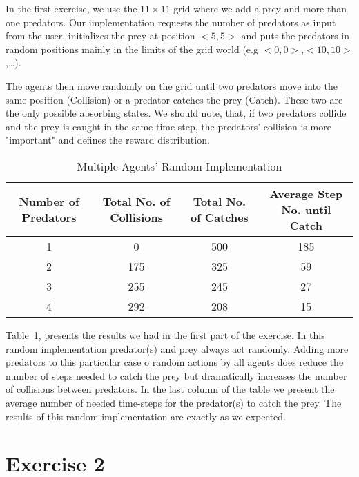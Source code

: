 \documentclass[a4paper,11pt]{article}
\begin{document}
In the first exercise, we use the $11 \times 11$ grid where we add a prey and more than one predators. Our implementation requests the number of predators as input from the user, initializes the prey at position $<5,5>$ and puts the predators in random positions mainly in the limits of the grid world (e.g $<0,0>$,$<10,10>$,\ldots). 

The agents then move randomly on the grid until two predators move into the same position (Collision) or a predator catches the prey (Catch). These two are the only possible absorbing states. We should note, that, if two predators collide and the prey is caught in the same time-step, the predators' collision is more "important" and defines the reward distribution.


\begin{table}[h]
\begin{center}
\caption{Multiple Agents' Random Implementation}
\begin{tabular}{c c c c} 
\hline\hline               
\textbf{\small{Number of Predators}} & \textbf{\small{Total No. of Collisions}} & \textbf{\small{Total No. of Catches}} & \textbf{\small{Average Step No. until Catch}} \\  
\hline
1 & 0 & 500 & 185\\ 
2 & 175 & 325  & 59\\
3 & 255 & 245   & 27\\
4 & 292 & 208 & 15 \\ 
\end{tabular}
\label{table:multirandom} 
\end{center} 
\end{table} 
\begin{center}

\end{center}

Table~\ref{table:multirandom}, presents the results we had in the first part of the exercise. In this random implementation predator(s) and prey always act randomly. Adding more predators to this particular case o random actions by all agents does reduce the number of steps needed to catch the prey but dramatically increases the number of collisions between predators. In the last column of the table we present the average number of needed time-steps for the predator(s) to catch the prey. The results of this random implementation are exactly as we expected.
 

\section{Exercise 2}
\end{document}
